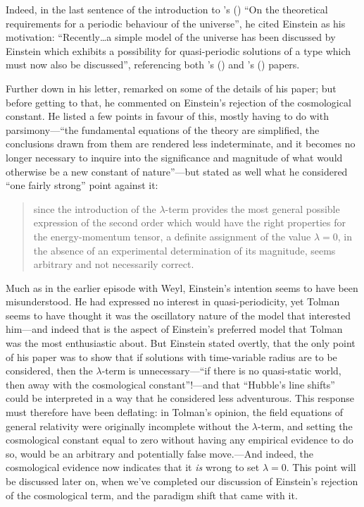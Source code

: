 \documentclass[12 pt]{article}
\def\citeapos#1{\citeauthor{#1}'s (\citeyear{#1})}
\begin{document}
Indeed, in the last sentence of the introduction to \citeapos{Tolman1931b} ``On the theoretical requirements for a periodic behaviour of the universe'', he cited Einstein as his motivation: ``Recently\ldots a simple model of the universe has been discussed by Einstein which exhibits a possibility for quasi-periodic solutions of a type which must now also be discussed'', referencing both \citeapos{Einstein1931a} and \citeapos{deSitter1931} papers. 

Further down in his letter, \citet{Tolman1931a} remarked on some of the details of his paper; but before getting to that, he commented on Einstein's rejection of the cosmological constant. He listed a few points in favour of this, mostly having to do with parsimony---``the fundamental equations of the theory are simplified, the conclusions drawn from them are rendered less indeterminate, and it becomes no longer necessary to inquire into the significance and magnitude of what would otherwise be a new constant of nature''---but stated as well what he considered ``one fairly strong'' point against it: 
\begin{quote}
since the introduction of the $\lambda$-term provides the most general possible expression of the second order which would have the right properties for the energy-momentum tensor, a definite assignment of the value $\lambda=0$, in the absence of an experimental determination of its magnitude, seems arbitrary and not necessarily correct. 
\end{quote}

Much as in the earlier episode with Weyl, Einstein's intention seems to have been misunderstood. He had expressed no interest in quasi-periodicity, yet Tolman seems to have thought it was the oscillatory nature of the model that interested him---and indeed that is the aspect of Einstein's preferred model that Tolman was the most enthusiastic about. But Einstein stated overtly, that the only point of his paper was to show that if solutions with time-variable radius are to be considered, then the $\lambda$-term is unnecessary---``if there is no quasi-static world, then away with the cosmological constant''!---and that ``Hubble's line shifts'' could be interpreted in a way that he considered less adventurous. This response must therefore have been deflating: in Tolman's opinion, the field equations of general relativity were originally incomplete without the $\lambda$-term, and setting the cosmological constant equal to zero without having any empirical evidence to do so, would be an arbitrary and potentially false move.---And indeed, the cosmological evidence now indicates that it \textit{is} wrong to set $\lambda=0$. This point will be discussed later on, when we've completed our discussion of Einstein's rejection of the cosmological term, and the paradigm shift that came with it.
\end{document}
